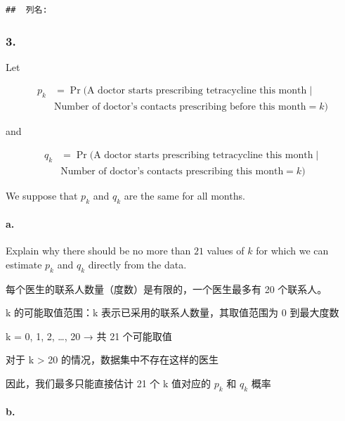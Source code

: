 \documentclass[
]{article}
\begin{document}
\begin{verbatim}
##  列名:
\end{verbatim}

\subsubsection{3.}\label{section-2}

Let

    \begin{equation}
    \begin{split}
    p_k & = \Pr(\text{A doctor starts prescribing tetracycline this month} \mid \\
     & \text{Number of doctor's contacts prescribing before this month}=k) 
     \end{split}
     \end{equation}

and

    \begin{equation}
    \begin{split}
     q_k & = \Pr(\text{A doctor starts prescribing tetracycline this month} \mid \\ 
     & \text{Number of doctor's contacts prescribing this month}=k)
     \end{split}
     \end{equation}

We suppose that \(p_k\) and \(q_k\) are the same for all months.

\paragraph{a.}\label{a.}

Explain why there should be no more than \(21\) values of \(k\) for
which we can estimate \(p_k\) and \(q_k\) directly from the data.

每个医生的联系人数量（度数）是有限的，一个医生最多有 20 个联系人。

k 的可能取值范围：k 表示已采用的联系人数量，其取值范围为 0 到最大度数

k = 0, 1, 2, \ldots, 20 → 共 21 个可能取值

对于 k \textgreater{} 20 的情况，数据集中不存在这样的医生

因此，我们最多只能直接估计 21 个 k 值对应的 \(p_k\) 和 \(q_k\) 概率

\paragraph{b.}\label{b.}
\end{document}
